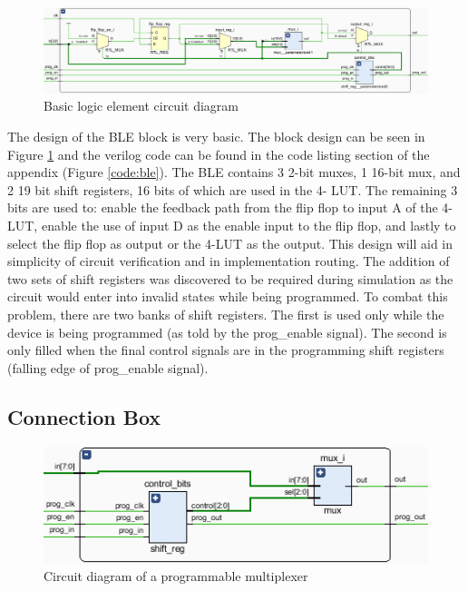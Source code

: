 \documentclass[12pt]{article}
\begin{document}
\begin{figure}[ht]
    \centering
    \includegraphics[width=\textwidth]{ble}
    \caption{Basic logic element circuit diagram}
    \label{fig:ble}
\end{figure}

The design of the BLE block is very basic. The block design can be seen in Figure 
\ref{fig:ble} and the verilog code can be found in the code listing section of the
appendix (Figure \ref{code:ble}). The BLE contains 3 2-bit muxes,
1 16-bit mux, and 2 19 bit shift registers, 16 bits of which are used in the 4-
LUT. The remaining 3 bits are used to: enable the feedback path from the flip flop 
to input A of the 4-LUT, enable the use of input D as the enable input to the flip 
flop, and lastly to select the flip flop as output or the 4-LUT as the output. This 
design will aid in simplicity of circuit verification and in implementation routing.
The addition of two sets of shift registers was discovered to be required during 
simulation as the circuit would enter into invalid states while being programmed. 
To combat this problem, there are two banks of shift registers. The first is used 
only while the device is being programmed (as told by the prog{\_}enable signal). The 
second is only filled when the final control signals are in the programming shift 
registers (falling edge of prog{\_}enable signal).

\subsection{Connection Box}

\begin{figure}[ht]
    \centering
    \includegraphics[width=\textwidth]{prog_mux}
    \caption{Circuit diagram of a programmable multiplexer}
    \label{fig:prog_mux}
\end{figure}
\end{document}
